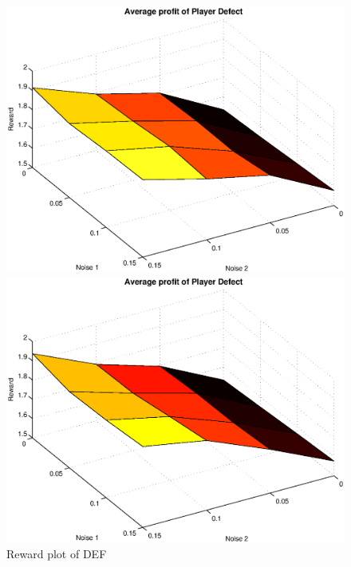 \begin{figure}[h]
	\caption{Reward plot of DEF}
	\label{pic player defect}
\begin{minipage}[hbt]{0.65\textwidth}
	\centering
	\includegraphics[width=\textwidth]{pics/simulation1/Reward_vs_Noise_of_Player_Defect}
\end{minipage}
\hfill
\begin{minipage}[hbt]{0.3\textwidth}
	\centering
	\includegraphics[width=\textwidth]{pics/simulation2/Reward_vs_Noise_of_Player_Defect}
\end{minipage}

\end{figure}


